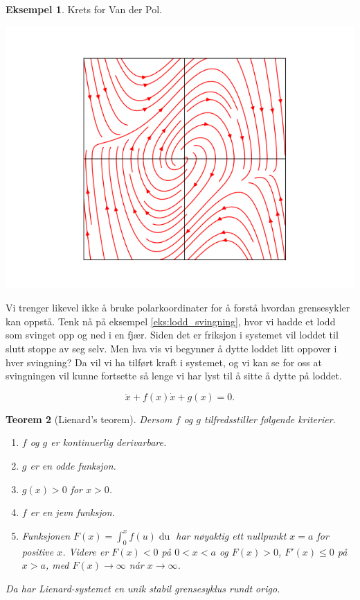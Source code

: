 \documentclass{article}
\theoremstyle{plain}
\newtheorem{teorem}{Teorem}\surroundwithmdframed{teorem}
\theoremstyle{definition}
\newtheorem{eksempel}[teorem]{Eksempel}
\theoremstyle{remark}
\newcommand{\diff}[1]{\mathop{d#1}}
\begin{document}
\begin{eksempel}
    Krets for Van der Pol.
    \begin{center}
        \includegraphics[scale=0.5]{van_der_pol.png}
    \end{center}
\end{eksempel}

Vi trenger likevel ikke å bruke polarkoordinater for å forstå hvordan grensesykler kan oppstå. Tenk nå på eksempel \ref{eks:lodd_svingning}, hvor vi hadde et lodd som svinget opp og ned i en fjær. Siden det er friksjon i systemet vil loddet til slutt stoppe av seg selv. Men hva vis vi begynner å dytte loddet litt oppover i hver svingning? Da vil vi ha tilført kraft i systemet, og vi kan se for oss at svingningen vil kunne fortsette så lenge vi har lyst til å sitte å dytte på loddet.


\begin{equation} \label{eq_lienard}
    \ddot{x} + f(x) \dot{x} + g(x) = 0.
\end{equation}

\begin{teorem}[Lienard's teorem]
    Dersom $f$ og $g$ tilfredsstiller følgende kriterier.
    \begin{enumerate}
        \item[(i)] $f$ og $g$ er kontinuerlig derivarbare.
        \item[(ii)] $g$ er en odde funksjon.
        \item[(iii)] $g(x) > 0$ for $x > 0$.
        \item[(iv)] $f$ er en jevn funksjon.
        \item[(v)] Funksjonen $F(x) = \int_0^x f(u) \diff{u}$ har nøyaktig ett nullpunkt $x = a$ for positive $x$. Videre er $F(x) < 0$ på $0 < x < a$ og $F(x) > 0$, $F'(x) \leq 0$ på $x > a$, med $F(x) \rightarrow \infty$ når $x \rightarrow \infty$.
    \end{enumerate}
    Da har Lienard-systemet en unik stabil grensesyklus rundt origo.
\end{teorem}
\end{document}
